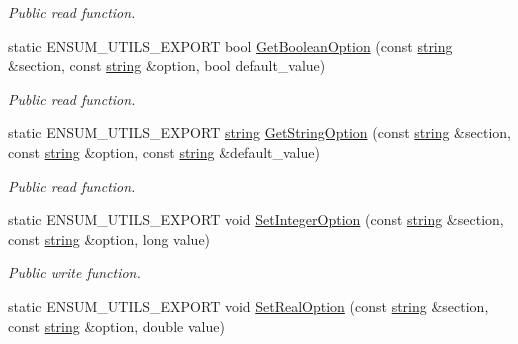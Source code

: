 \begin{DoxyCompactItemize}
\begin{DoxyCompactList}\small\item\em Public read function. \end{DoxyCompactList}\item 
static E\+N\+S\+U\+M\+\_\+\+U\+T\+I\+L\+S\+\_\+\+E\+X\+P\+O\+RT bool \hyperlink{class_ensum_1_1_utils_1_1_options_ad0925b8894344c6d4425fbf0acde3852}{Get\+Boolean\+Option} (const \hyperlink{class_ensum_1_1string}{string} \&section, const \hyperlink{class_ensum_1_1string}{string} \&option, bool default\+\_\+value)\hypertarget{class_ensum_1_1_utils_1_1_options_ad0925b8894344c6d4425fbf0acde3852}{}\label{class_ensum_1_1_utils_1_1_options_ad0925b8894344c6d4425fbf0acde3852}

\begin{DoxyCompactList}\small\item\em Public read function. \end{DoxyCompactList}\item 
static E\+N\+S\+U\+M\+\_\+\+U\+T\+I\+L\+S\+\_\+\+E\+X\+P\+O\+RT \hyperlink{class_ensum_1_1string}{string} \hyperlink{class_ensum_1_1_utils_1_1_options_ac89c9d4c8e4dde0a1b07745c97d082a9}{Get\+String\+Option} (const \hyperlink{class_ensum_1_1string}{string} \&section, const \hyperlink{class_ensum_1_1string}{string} \&option, const \hyperlink{class_ensum_1_1string}{string} \&default\+\_\+value)\hypertarget{class_ensum_1_1_utils_1_1_options_ac89c9d4c8e4dde0a1b07745c97d082a9}{}\label{class_ensum_1_1_utils_1_1_options_ac89c9d4c8e4dde0a1b07745c97d082a9}

\begin{DoxyCompactList}\small\item\em Public read function. \end{DoxyCompactList}\item 
static E\+N\+S\+U\+M\+\_\+\+U\+T\+I\+L\+S\+\_\+\+E\+X\+P\+O\+RT void \hyperlink{class_ensum_1_1_utils_1_1_options_a1d69b78fe5f4072908f5b615cd1ee9b4}{Set\+Integer\+Option} (const \hyperlink{class_ensum_1_1string}{string} \&section, const \hyperlink{class_ensum_1_1string}{string} \&option, long value)\hypertarget{class_ensum_1_1_utils_1_1_options_a1d69b78fe5f4072908f5b615cd1ee9b4}{}\label{class_ensum_1_1_utils_1_1_options_a1d69b78fe5f4072908f5b615cd1ee9b4}

\begin{DoxyCompactList}\small\item\em Public write function. \end{DoxyCompactList}\item 
static E\+N\+S\+U\+M\+\_\+\+U\+T\+I\+L\+S\+\_\+\+E\+X\+P\+O\+RT void \hyperlink{class_ensum_1_1_utils_1_1_options_ad8ebf2ce046cc95530f787bf372e7fd2}{Set\+Real\+Option} (const \hyperlink{class_ensum_1_1string}{string} \&section, const \hyperlink{class_ensum_1_1string}{string} \&option, double value)\hypertarget{class_ensum_1_1_utils_1_1_options_ad8ebf2ce046cc95530f787bf372e7fd2}{}\label{class_ensum_1_1_utils_1_1_options_ad8ebf2ce046cc95530f787bf372e7fd2}


\end{DoxyCompactItemize}
